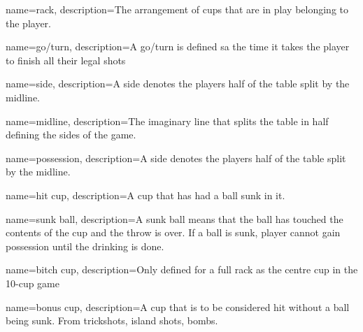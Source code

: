  {
        name=rack,
        description={The arrangement of cups that are in play belonging to the player.}
}

 {
        name=go/turn,
        description={A go/turn is defined sa the time it takes the player to finish all their legal shots}
}

 {
        name=side,
        description={A side denotes the players half of the table split by the midline.}
}

 {
	name=midline,
	description={The imaginary line that splits the table in half defining the sides of the game.}
}

 {
	name=possession,
	description={A side denotes the players half of the table split by the midline.}
}

 {
	name=hit cup,
	description={A cup that has had a ball sunk in it.}
}

 {
	name=sunk ball,
	description={A sunk ball means that the ball has touched the contents of the cup and the throw is over. If a ball is sunk, player cannot gain possession until the drinking is done.}
}

 {
	name=bitch cup,
	description={Only defined for a full rack as the centre cup in the 10-cup game}
}

 {
	name=bonus cup,
	description={A cup that is to be considered hit without a ball being sunk. From trickshots, island shots, bombs.}
}
